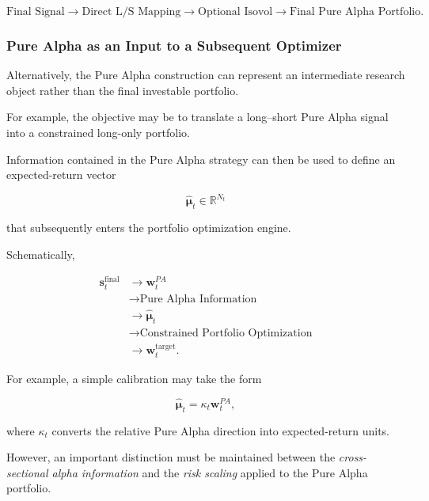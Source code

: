\documentclass[11pt,a4paper]{article}
\begin{document}
\begin{equation}
\boxed{
\text{Final Signal}
\rightarrow
\text{Direct L/S Mapping}
\rightarrow
\text{Optional Isovol}
\rightarrow
\text{Final Pure Alpha Portfolio}.
}
\end{equation}


\subsubsection{Pure Alpha as an Input to a Subsequent Optimizer}

Alternatively, the Pure Alpha construction can represent an intermediate
research object rather than the final investable portfolio.

For example, the objective may be to translate a long--short Pure Alpha signal
into a constrained long-only portfolio.

Information contained in the Pure Alpha strategy can then be used to define an
expected-return vector

\begin{equation}
\widehat{\boldsymbol{\mu}}_t
\in
\mathbb{R}^{N_t}
\end{equation}

that subsequently enters the portfolio optimization engine.

Schematically,

\begin{equation}
\boxed{
\begin{aligned}
\mathbf{s}_t^{\mathrm{final}}
&\rightarrow
\mathbf{w}_t^{PA}
\\
&\rightarrow
\text{Pure Alpha Information}
\\
&\rightarrow
\widehat{\boldsymbol{\mu}}_t
\\
&\rightarrow
\text{Constrained Portfolio Optimization}
\\
&\rightarrow
\mathbf{w}_t^{\mathrm{target}}.
\end{aligned}
}
\end{equation}

For example, a simple calibration may take the form

\begin{equation}
\boxed{
\widehat{\boldsymbol{\mu}}_t
=
\kappa_t
\mathbf{w}_t^{PA},
}
\end{equation}

where $\kappa_t$ converts the relative Pure Alpha direction into expected-return
units.

However, an important distinction must be maintained between the
\emph{cross-sectional alpha information} and the \emph{risk scaling} applied to
the Pure Alpha portfolio.
\end{document}
